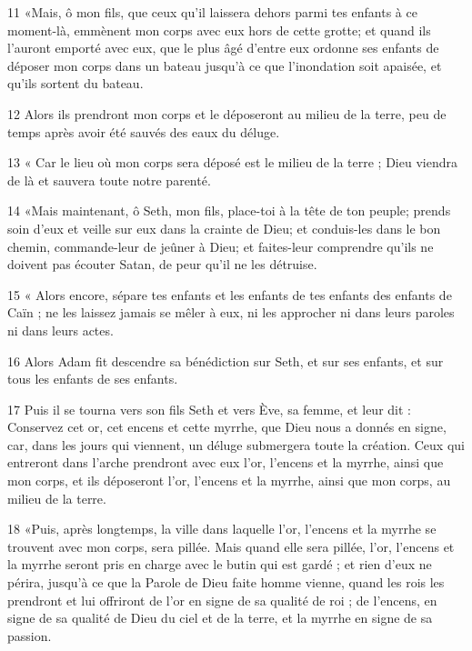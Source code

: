 \par 11 «Mais, ô mon fils, que ceux qu'il laissera dehors parmi tes enfants à ce moment-là, emmènent mon corps avec eux hors de cette grotte; et quand ils l'auront emporté avec eux, que le plus âgé d'entre eux ordonne ses enfants de déposer mon corps dans un bateau jusqu'à ce que l'inondation soit apaisée, et qu'ils sortent du bateau.

\par 12 Alors ils prendront mon corps et le déposeront au milieu de la terre, peu de temps après avoir été sauvés des eaux du déluge.

\par 13 « Car le lieu où mon corps sera déposé est le milieu de la terre ; Dieu viendra de là et sauvera toute notre parenté.

\par 14 «Mais maintenant, ô Seth, mon fils, place-toi à la tête de ton peuple; prends soin d'eux et veille sur eux dans la crainte de Dieu; et conduis-les dans le bon chemin, commande-leur de jeûner à Dieu; et faites-leur comprendre qu’ils ne doivent pas écouter Satan, de peur qu’il ne les détruise.

\par 15 « Alors encore, sépare tes enfants et les enfants de tes enfants des enfants de Caïn ; ne les laissez jamais se mêler à eux, ni les approcher ni dans leurs paroles ni dans leurs actes.

\par 16 Alors Adam fit descendre sa bénédiction sur Seth, et sur ses enfants, et sur tous les enfants de ses enfants.

\par 17 Puis il se tourna vers son fils Seth et vers Ève, sa femme, et leur dit : Conservez cet or, cet encens et cette myrrhe, que Dieu nous a donnés en signe, car, dans les jours qui viennent, un déluge submergera toute la création. Ceux qui entreront dans l'arche prendront avec eux l'or, l'encens et la myrrhe, ainsi que mon corps, et ils déposeront l'or, l'encens et la myrrhe, ainsi que mon corps, au milieu de la terre.

\par 18 «Puis, après longtemps, la ville dans laquelle l'or, l'encens et la myrrhe se trouvent avec mon corps, sera pillée. Mais quand elle sera pillée, l'or, l'encens et la myrrhe seront pris en charge avec le butin qui est gardé ; et rien d’eux ne périra, jusqu’à ce que la Parole de Dieu faite homme vienne, quand les rois les prendront et lui offriront de l’or en signe de sa qualité de roi ; de l’encens, en signe de sa qualité de Dieu du ciel et de la terre, et la myrrhe en signe de sa passion.

